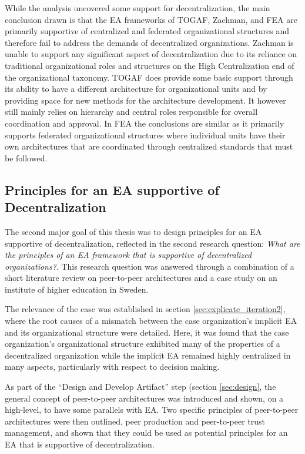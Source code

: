 While the analysis uncovered some support for decentralization, the main conclusion drawn is that the EA frameworks of TOGAF, Zachman, and FEA are primarily supportive of centralized and federated organizational structures and therefore fail to address the demands of decentralized organizations. Zachman is unable to support any significant aspect of decentralization due to its reliance on traditional organizational roles and structures on the High Centralization end of the organizational taxonomy. TOGAF does provide some basic support through its ability to have a different architecture for organizational units and by providing space for new methods for the architecture development. It however still mainly relies on hierarchy and central roles responsible for overall coordination and approval. In FEA the conclusions are similar as it primarily supports federated organizational structures where individual units have their own architectures that are coordinated through centralized standards that must be followed.


\subsection{Principles for an EA supportive of Decentralization}

The second major goal of this thesis was to design principles for an EA supportive of decentralization, reflected in the second research question: \textit{What are the principles of an EA framework that is supportive of decentralized organizations?}.  This research question was answered through a combination of a short literature review on peer-to-peer architectures and a case study on an institute of higher education in Sweden. 

The relevance of the case was established in section \ref{sec:explicate_iteration2}, where the root causes of a mismatch between the case organization's implicit EA and its organizational structure were detailed. Here, it was found that the case organization's organizational structure exhibited many of the properties of a decentralized organization while the implicit EA remained highly centralized in many aspects, particularly with respect to decision making. 

As part of the ``Design and Develop Artifact'' step (section \ref{sec:design}, the general concept of peer-to-peer architectures was introduced and shown, on a high-level, to have some parallels with EA. Two specific principles of peer-to-peer architectures were then outlined, peer production and peer-to-peer trust management, and shown that they could be used as potential principles for an EA that is supportive of decentralization. 

